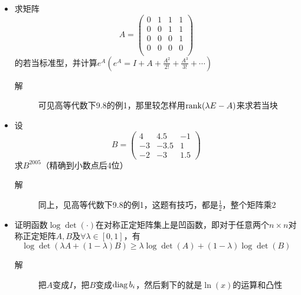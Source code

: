 \begin{itemize}
\item 求矩阵
\[
A=\left(
\begin{array}{cccc}
0 & 1 & 1 & 1\\
0 & 0 & 1 & 1\\
0 & 0 & 0 & 1\\
0 & 0 & 0 & 0\\
\end{array}
\right)
\]
的若当标准型，并计算$e^A(e^A=I+A+\frac{A^2}{2!}+\frac{A^3}{3!}+\cdots)$
\begin{description}
\item[解] 可见高等代数下9.8的例1，那里较怎样用$\operatorname{rank}(\lambda E-A)$来求若当块
\end{description}

\item 设
\[
B=\left(
\begin{array}{ccc}
4 & 4.5 & -1\\
-3 & -3.5 & 1 \\
-2 & -3 & 1.5
\end{array}
\right)
\]
求$B^{2005}$（精确到小数点后4位）
\begin{description}
\item[解] 同上，见高等代数下9.8的例1，这题有技巧，都是$\frac{1}{2}$，整个矩阵乘2
\end{description}

\item 证明函数$\log \det(\cdot)$在对称正定矩阵集上是凹函数，即对于任意两个$n\times n$对称正定矩阵$A,B$及$\forall \lambda \in [0,1]$，有
\[
\log \det(\lambda A+(1-\lambda)B)\geq \lambda \log\det(A)+(1-\lambda)\log\det(B)
\]
\begin{description}
\item[解] 把$A$变成$I$，把$B$变成$\operatorname{diag}{b_i}$，然后剩下的就是$\ln(x)$的运算和凸性
\end{description}


\end{itemize}
